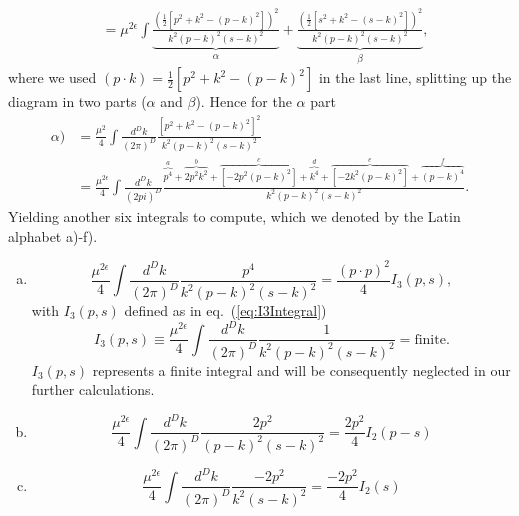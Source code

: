 \begin{enumerate}[i)]
\begin{equation}
\begin{split}
					&= \mu^{2\epsilon}\int \underbrace{\frac{\left( \frac{1}{2} [p^2 + k^2 -(p-k)^2 ] \right)^2}{k^2(p-k)^2(s-k)^2}}_{\alpha} + \underbrace{\frac{\left( \frac{1}{2} [s^2 + k^2 -(s-k)^2 ] \right)^2}{k^2(p-k)^2(s-k)^2}}_{\beta}, 
				\end{split}
			\end{equation}
			where we used $(p\cdot k) = \frac{1}{2}[p^2 + k^2 - (p-k)^2]$ in the last line, splitting up the diagram in two parts ($\alpha$ and $\beta$). Hence for the $\alpha$ part 
			\begin{equation}
				\begin{split}
					\alpha) &= \frac{\mu^2}{4}\int\frac{d^Dk}{(2\pi)^D}\frac{[p^2+k^2-(p-k)^2]^2}{k^2(p-k)^2(s-k)^2} \\ 
					&= \frac{\mu^{2\epsilon}}{4}\int\frac{d^Dk}{(2pi)^D}\frac{\overbrace{p^4}^{a} + \overbrace{2p^2k^2}^{b} + \overbrace{[-2p^2(p-k)^2]}^{c} + \overbrace{k^4}^{d} + \overbrace{[-2k^2(p-k)^2]}^{e} + \overbrace{(p-k)^4}^{f}}{k^2 (p-k)^2 (s-k)^2}.
				\end{split}
			\end{equation}	
			Yielding another six integrals to compute, which we denoted by the Latin alphabet a)-f). \\
			\begin{enumerate}[a)]
				\item 
					\begin{equation}
						\frac{\mu^{2\epsilon}}{4}\int\frac{d^Dk}{(2\pi)^D}\frac{p^4}{k^2(p-k)^2(s-k)^2} = \frac{(p\cdot p)^2}{4} I_3(p,s),
					\end{equation} 
					with $I_3(p,s)$ defined as in eq.~(\ref{eq:I3Integral})
					\begin{equation}
						I_3(p,s) \equiv \frac{\mu^{2\epsilon}}{4}\int\frac{d^Dk}{(2\pi)^D}\frac{1}{k^2(p-k)^2(s-k)^2} = \text{finite}. 
					\end{equation}
					$I_3(p,s)$ represents a finite integral and will be consequently neglected in our further calculations.
				\item
					\begin{equation}
						\frac{\mu^{2\epsilon}}{4}\int\frac{d^Dk}{(2\pi)^D}\frac{2p^2}{(p-k)^2(s-k)^2} = \frac{2p^2}{4}I_2(p-s)	
					\end{equation}
				\item 
					\begin{equation}
						\frac{\mu^{2\epsilon}}{4}\int\frac{d^Dk}{(2\pi)^D}\frac{-2p^2}{k^2(s-k)^2} = \frac{-2p^2}{4}I_2(s)	
					\end{equation}

\end{enumerate}
\end{enumerate}
